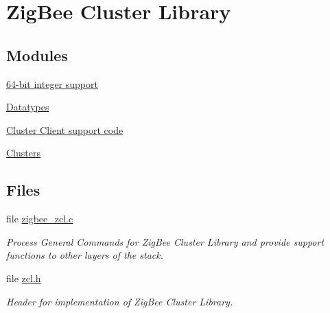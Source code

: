 \hypertarget{group__zcl}{\section{Zig\-Bee Cluster Library}
\label{group__zcl}
}
\subsection*{Modules}
\begin{DoxyCompactItemize}
\item 
\hyperlink{group__zcl__64}{64-\/bit integer support}
\item 
\hyperlink{group__zcl__types}{Datatypes}
\item 
\hyperlink{group__zcl__client}{Cluster Client support code}
\item 
\hyperlink{group__zcl__clusters}{Clusters}
\end{DoxyCompactItemize}
\subsection*{Files}
\begin{DoxyCompactItemize}
\item 
file \hyperlink{zigbee__zcl_8c}{zigbee\-\_\-zcl.\-c}
\begin{DoxyCompactList}\small\item\em Process General Commands for Zig\-Bee Cluster Library and provide support functions to other layers of the stack. \end{DoxyCompactList}\item 
file \hyperlink{zcl_8h}{zcl.\-h}
\begin{DoxyCompactList}\small\item\em Header for implementation of Zig\-Bee Cluster Library. \end{DoxyCompactList}\end{DoxyCompactItemize}
